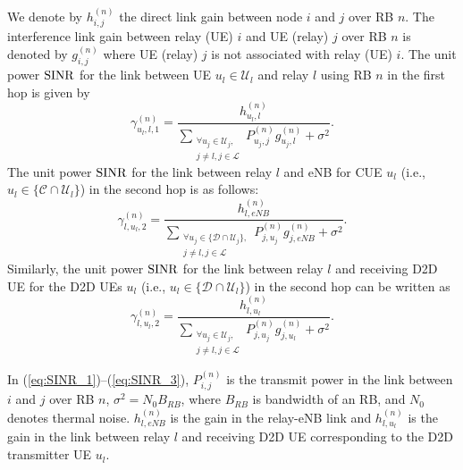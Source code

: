 \documentclass[twocolumn,10pt]{IEEEtran}
\begin{document}
We denote by $h_{i,j}^{(n)}$ the direct link gain between node $i$ and $j$ over RB $n$. The interference link gain between relay (UE) $i$  and UE (relay) $j$ over RB $n$ is denoted by $g_{i,j}^{(n)}$  where UE (relay) $j$ is not associated with relay (UE) $i$.  The unit power ${\rm SINR}$ for the link between UE $u_l \in \mathcal{U}_l$ and relay $l$ using RB $n$ in the first hop is given by
\begin{equation}
\label{eq:SINR_1}
\gamma_{u_l, l, 1}^{(n)} = \frac{h_{u_l, l}^{(n)}}{\displaystyle \sum_{\substack{\forall u_j \in \mathcal U_j, \\ j \neq l, j \in \mathcal{L}}} P_{u_j, j}^{(n)} g_{u_j, l}^{(n)} + \sigma^2}.
\end{equation}
The unit power ${\rm SINR}$ for the link between relay $l$ and eNB  for CUE $u_l$ (i.e.,  $u_l \in \lbrace \mathcal{C} \cap \mathcal{U}_l \rbrace$) in the second hop is as follows: 
\begin{equation}
\label{eq:SINR_2}
\gamma_{l, u_l, 2}^{(n)} = \frac{h_{l, eNB}^{(n)}}{\displaystyle \sum_{\substack{\forall u_j \in \lbrace \mathcal{D} \cap \mathcal{U}_j \rbrace, \\ j \neq l, j \in \mathcal{L}}} P_{j, u_j}^{(n)} g_{j, eNB}^{(n)} + \sigma^2}.
\end{equation}
Similarly, the unit power ${\rm SINR}$ for the link between relay $l$ and receiving D2D UE for the D2D UEs $u_l$ (i.e., $u_l \in \lbrace \mathcal{D} \cap \mathcal{U}_l \rbrace$) in the second hop can be written as
\begin{equation}
\label{eq:SINR_3}
\gamma_{l, u_l, 2}^{(n)} = \frac{h_{l, u_l}^{(n)}}{\displaystyle \sum_{\substack{\forall u_j \in  \mathcal{U}_j, \\ j \neq l, j \in \mathcal{L}}} P_{j, u_j}^{(n)} g_{j, u_l}^{(n)} + \sigma^2}.
\end{equation}

In  (\ref{eq:SINR_1})--(\ref{eq:SINR_3}), $P_{i, j}^{(n)}$ is the transmit power in the  link between $i$ and $j$ over RB $n$, $\sigma^2 =  N_0 B_{RB}$, where $B_{RB}$ is bandwidth of an RB, and $N_0$ denotes thermal noise.  $h_{l, eNB}^{(n)}$ is the gain in the relay-eNB link and $h_{l, u_l}^{(n)}$ is the gain in the link between relay $l$ and receiving D2D UE corresponding to the D2D transmitter UE $u_l$.
\end{document}
